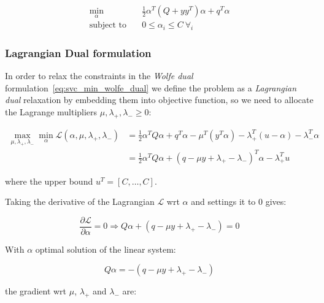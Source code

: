 \begin{equation} \label{eq:svc_min_bcqp_wolf_dual}
    \begin{aligned}
        \min_{\alpha} \quad & \frac{1}{2} \alpha^T (Q + yy^T)\alpha+q^T\alpha \\
            \text{subject to} \quad & 0\leq\alpha_i\leq C \ \forall_i
    \end{aligned}
\end{equation}

\subsubsection{Lagrangian Dual formulation}

In order to relax the constraints in the \emph{Wolfe dual} formulation~\eqref{eq:svc_min_wolfe_dual} we define the problem as a \emph{Lagrangian dual} relaxation by embedding them into objective function, so we need to allocate the Lagrange multipliers $\mu, \lambda_+, \lambda_- \geq 0$:

\begin{equation} \label{eq:svc_lagrangian_dual}
	\begin{aligned}
		    \max_{\mu,\lambda_+,\lambda_-} \min_{\alpha} \mathcal{L}(\alpha,\mu,\lambda_+,\lambda_-) &= \frac{1}{2} \alpha^T Q\alpha+q^T\alpha - \mu^T (y^T \alpha) - \lambda_+^T (u - \alpha) - \lambda_-^T \alpha \\
    &= \frac{1}{2} \alpha^T Q\alpha + (q - \mu y + \lambda_+ - \lambda_-)^T \alpha - \lambda_+^T u
	\end{aligned}
\end{equation}

where the upper bound $u^T = [C, \dots, C]$.

Taking the derivative of the Lagrangian $\mathcal{L}$ wrt $\alpha$ and settings it to 0 gives:

\begin{equation} \label{eq:svc_lagrangian_der_a}
	\frac{\partial \mathcal{L}}{\partial \alpha}=0\Rightarrow Q \alpha + (q - \mu y + \lambda_+ - \lambda_-) = 0
\end{equation}

With $\alpha$ optimal solution of the linear system:

\begin{equation} \label{eq:svc_lagrangian_sol}
    Q \alpha = - (q - \mu y + \lambda_+ - \lambda_-)
\end{equation}

the gradient wrt $\mu$, $\lambda_+$ and $\lambda_-$ are:

